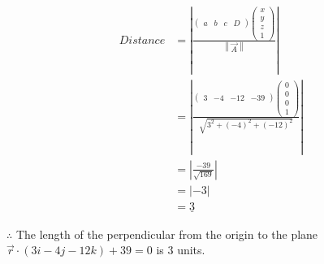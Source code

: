 \documentclass[11pt, oneside, twocolumn, reqno]{article}   	%
\newcommand{\myvec}[1]{\ensuremath{\begin{pmatrix}#1\end{pmatrix}}}
\providecommand{\norm}[1]{\left\lVert#1\right\rVert}
\providecommand{\abs}[1]{\left\vert#1\right\vert}
\providecommand{\brak}[1]{\ensuremath{\left(#1\right)}}
\begin{document}
\begin{align}
Distance &= \abs{\frac{\myvec{a & b & c & D} \myvec{x \\ y \\ z \\ 1}}{\norm{\vec{A}}}}\\
&= \abs{\frac{\myvec{3 & -4 & -12 & -39} \myvec{0 \\ 0 \\ 0 \\ 1}}{\sqrt{3^{2} + \brak{-4}^{2} + \brak{-12}^{2}}}}\\
&= \abs{\frac{-39}{\sqrt{169}}}\\
&= \abs{-3}\\
&= \underline{3}
\end{align}

$\therefore$ The length of the perpendicular from the origin to the plane $\vec{r} \cdot \brak{3i - 4j - 12k} + 39 = 0$ is \underline{$3$} units.
\end{document}
